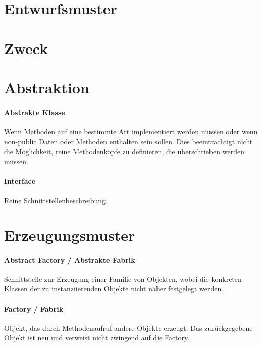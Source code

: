 \section{Entwurfsmuster}\label{entwurfsmuster}

\section{Zweck}\label{zweck}

\section{Abstraktion}\label{abstraktion}

\paragraph{Abstrakte Klasse}\label{abstrakte-klasse}

Wenn Methoden auf eine bestimmte Art implementiert werden müssen oder
wenn non-public Daten oder Methoden enthalten sein sollen. Dies
beeinträchtigt nicht die Möglichkeit, reine Methodenköpfe zu definieren,
die überschrieben werden müssen.

\paragraph{Interface}\label{interface}

Reine Schnittstellenbeschreibung.

\section{Erzeugungsmuster}\label{erzeugungsmuster}

\paragraph{Abstract Factory / Abstrakte Fabrik}\label{abstract-factory}

Schnittstelle zur Erzeugung einer Familie von Objekten, wobei die konkreten
Klassen der zu instanziierenden Objekte nicht näher festgelegt werden.

\paragraph{Factory / Fabrik}\label{factory}

Objekt, das durch Methodenaufruf andere Objekte erzeugt. Das zurückgegebene
Objekt ist neu und verweist nicht zwingend auf die Factory.

